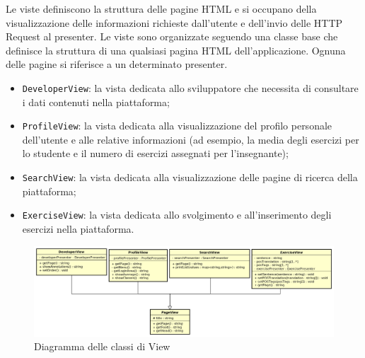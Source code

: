 Le viste definiscono la struttura delle pagine HTML e si occupano della visualizzazione delle informazioni richieste dall'utente e dell'invio delle HTTP Request al presenter. Le viste sono organizzate seguendo una classe base che definisce la struttura di una qualsiasi pagina HTML dell'applicazione. Ognuna delle pagine si riferisce a un determinato presenter.
\begin{itemize}
	\item \texttt{DeveloperView}: la vista dedicata allo sviluppatore che necessita di consultare i dati contenuti nella piattaforma; 
	\item \texttt{ProfileView}: la vista dedicata alla visualizzazione del profilo personale dell'utente e alle relative informazioni (ad esempio, la media degli esercizi per lo studente e il numero di esercizi assegnati per l'insegnante);
	\item \texttt{SearchView}: la vista dedicata alla visualizzazione delle pagine di ricerca della piattaforma;
	\item \texttt{ExerciseView}: la vista dedicata allo svolgimento e all'inserimento degli esercizi nella piattaforma.
\end{itemize}

\begin{figure}[h]
	\includegraphics[scale=0.41]{images/View.png}
	\caption{Diagramma delle classi di View}
\end{figure}
